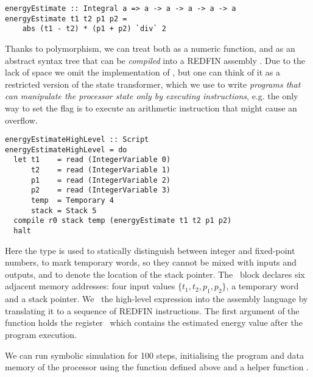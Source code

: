 
\begin{verbatim}
energyEstimate :: Integral a => a -> a -> a -> a -> a
energyEstimate t1 t2 p1 p2 =
    abs (t1 - t2) * (p1 + p2) `div` 2
\end{verbatim}

\noindent
Thanks to polymorphism, we can treat  both as a numeric
function, and as an abstract syntax tree that can be \emph{compiled} into a
REDFIN assembly . Due to the lack of space we omit the implementation
of , but one can think of it as a restricted version
of the  state transformer, which we use to write \emph{programs that
can manipulate the processor state only by executing instructions}, e.g. the
only way to set the  flag is to execute an arithmetic instruction
that might cause an overflow.

\begin{verbatim}
energyEstimateHighLevel :: Script
energyEstimateHighLevel = do
  let t1    = read (IntegerVariable 0)
      t2    = read (IntegerVariable 1)
      p1    = read (IntegerVariable 2)
      p2    = read (IntegerVariable 3)
      temp  = Temporary 4
      stack = Stack 5
  compile r0 stack temp (energyEstimate t1 t2 p1 p2)
  halt
\end{verbatim}
\label{energyEstimateHighLevel}

\noindent
Here the type  is used to statically distinguish between integer
and fixed-point numbers,  to mark temporary words, so they cannot
be mixed with inputs and outputs, and  to denote the location of the
stack pointer. The~ block declares six adjacent memory addresses: four
input values $\{t_1, t_2, p_1, p_2\}$, a temporary word and a stack pointer.
We~ the high-level expression  into the assembly
language by translating it to a sequence of REDFIN instructions. The first
argument of the~ function holds the register~ which contains
the estimated energy value after the program execution.

We can run symbolic simulation for 100 steps, initialising the program and data
memory of the processor using the function  defined above and a
helper function .

